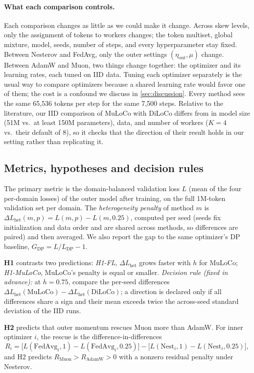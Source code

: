 \documentclass{article}
\newcommand{\Lhet}{\Delta L_{\mathrm{het}}}
\begin{document}
\paragraph{What each comparison controls.} Each comparison changes as little as we could make it change. Across skew levels, only the assignment of tokens to workers changes; the token multiset, global mixture, model, seeds, number of steps, and every hyperparameter stay fixed. Between Nesterov and FedAvg, only the outer settings $(\eta_{\mathrm{out}}, \mu)$ change. Between AdamW and Muon, two things change together: the optimizer and its learning rates, each tuned on IID data. Tuning each optimizer separately is the usual way to compare optimizers because a shared learning rate would favor one of them; the cost is a confound we discuss in \cref{sec:discussion}. Every method sees the same 65{,}536 tokens per step for the same 7{,}500 steps. Relative to the literature, our IID comparison of MuLoCo with DiLoCo differs from \citet{therien2025muloco} in model size (51M vs.\ at least 150M parameters), data, and number of workers ($K=4$ vs.\ their default of 8), so it checks that the direction of their result holds in our setting rather than replicating it.

\subsection{Metrics, hypotheses and decision rules}\label{sec:hypotheses}
The primary metric is the domain-balanced validation loss $L$ (mean of the four per-domain losses) of the outer model after training, on the full 1M-token validation set per domain. The \emph{heterogeneity penalty} of method $m$ is $\Lhet(m, p) = L(m, p) - L(m, 0.25)$, computed per seed (seeds fix initialization and data order and are shared across methods, so differences are paired) and then averaged. We also report the gap to the same optimizer's DP baseline, $G_{\mathrm{DP}} = L/L_{\mathrm{DP}} - 1$.

\textbf{H1} contrasts two predictions: \emph{H1-FL}, $\Lhet$ grows faster with $h$ for MuLoCo; \emph{H1-MuLoCo}, MuLoCo's penalty is equal or smaller. \emph{Decision rule (fixed in advance):} at $h=0.75$, compare the per-seed
differences $\Lhet(\mathrm{MuLoCo}) - \Lhet(\mathrm{DiLoCo})$; a direction is declared only if all differences share a sign and their mean exceeds twice the across-seed standard deviation of the IID runs.

\textbf{H2} predicts that outer momentum rescues Muon more than AdamW. For inner optimizer $i$, the rescue is the difference-in-differences
\begin{equation}
  R_i = \big[L(\text{FedAvg}_i, 1) - L(\text{FedAvg}_i, 0.25)\big] - \big[L(\text{Nest}_i, 1) - L(\text{Nest}_i, 0.25)\big],
\end{equation}
and H2 predicts $R_{\mathrm{Muon}} > R_{\mathrm{AdamW}} > 0$ with a nonzero residual penalty under Nesterov.
\end{document}
